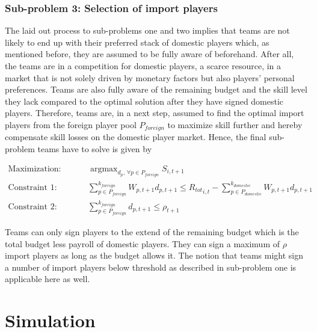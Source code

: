 \documentclass[12pt, a4paper]{article}
\DeclareMathOperator*{\argmax}{argmax} %
\begin{document}
\subsubsection{Sub-problem 3: Selection of import players}
\label{subProblem3}

The laid out process to sub-problems one and two implies that teams are not likely to end up with their preferred stack of domestic players which, as mentioned before, they are assumed to be fully aware of beforehand. After all, the teams are in a competition for domestic players, a scarce resource, in a market that is not solely driven by monetary factors but also players' personal preferences. Teams are also fully aware of the remaining budget and the skill level they lack compared to the optimal solution after they have signed domestic players. Therefore, teams are, in a next step, assumed to find the optimal import players from the foreign player pool $P_{foreign}$ to maximize skill further and hereby compensate skill losses on the domestic player market. Hence, the final sub-problem teams have to solve is given by

\begin{equation}
\label{eq:subProblem3}
\begin{aligned}
\textrm{Maximization:} & \hspace{1cm} \argmax_{d_p, \, \forall p \in P_{foreign}} S_{i, t+1} \\
\textrm{Constraint 1:} & \hspace{1cm} \sum_{p \in P_{foreign}}^{k_{foreign}}{W_{p,t+1}d_{p,t+1}}\le{R_{tot}}_{i,t}-\sum_{p \in P_{domestic}}^{k_{domestic}}{W_{p,t+1}d_{p,t+1}}\\
\textrm{Constraint 2:} & \hspace{1cm} \sum_{p \in P_{foreign}}^{k_{foreign}}d_{p, t+1} \leq \rho_{t+1} 
\end{aligned}
\end{equation}

\noindent
Teams can only sign players to the extend of the remaining budget which is the total budget less payroll of domestic players. They can sign a maximum of $\rho$ import players as long as the budget allows it. The notion that teams might sign a number of import players below threshold as described in sub-problem one is applicable here as well. 

\section{Simulation}
\end{document}
